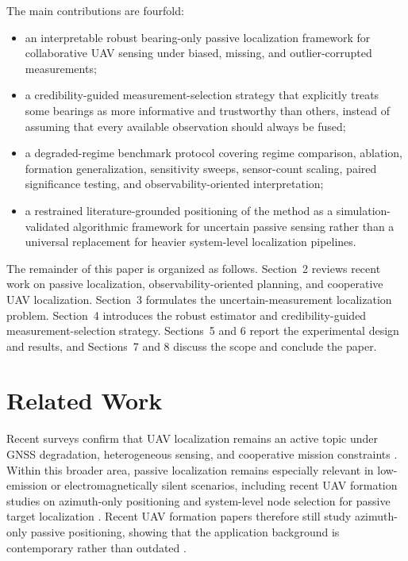 \documentclass[preprint,12pt]{elsarticle}
\begin{document}
The main contributions are fourfold:
\begin{itemize}
\item an interpretable robust bearing-only passive localization framework for collaborative UAV sensing under biased, missing, and outlier-corrupted measurements;
\item a credibility-guided measurement-selection strategy that explicitly treats some bearings as more informative and trustworthy than others, instead of assuming that every available observation should always be fused;
\item a degraded-regime benchmark protocol covering regime comparison, ablation, formation generalization, sensitivity sweeps, sensor-count scaling, paired significance testing, and observability-oriented interpretation;
\item a restrained literature-grounded positioning of the method as a simulation-validated algorithmic framework for uncertain passive sensing rather than a universal replacement for heavier system-level localization pipelines.
\end{itemize}

The remainder of this paper is organized as follows. Section~2 reviews recent work on passive localization, observability-oriented planning, and cooperative UAV localization. Section~3 formulates the uncertain-measurement localization problem. Section~4 introduces the robust estimator and credibility-guided measurement-selection strategy. Sections~5 and 6 report the experimental design and results, and Sections~7 and 8 discuss the scope and conclude the paper.

\section{Related Work}

Recent surveys confirm that UAV localization remains an active topic under GNSS degradation, heterogeneous sensing, and cooperative mission constraints \cite{kramaric2025comprehensive,liu2025survey,avola2024uav}. Within this broader area, passive localization remains especially relevant in low-emission or electromagnetically silent scenarios, including recent UAV formation studies on azimuth-only positioning and system-level node selection for passive target localization \cite{li2025bearing,xing2025node}. Recent UAV formation papers therefore still study azimuth-only passive positioning, showing that the application background is contemporary rather than outdated \cite{li2025bearing}.
\end{document}
